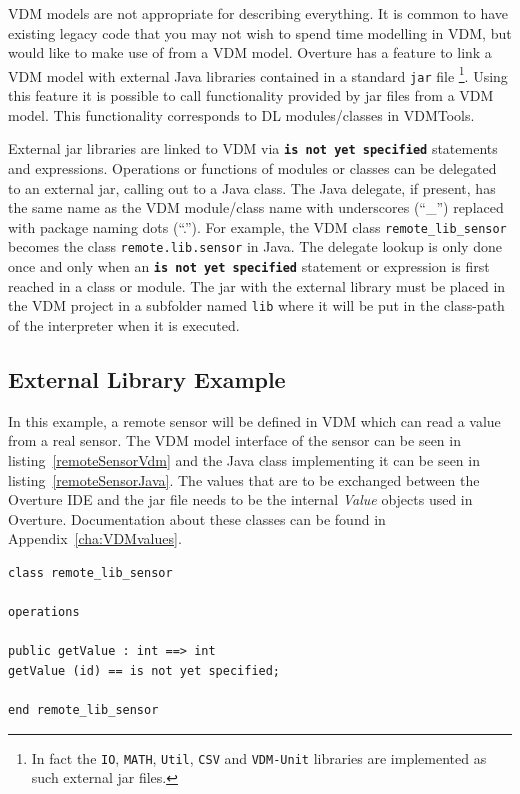 \documentclass{overturerepchap}
\begin{document}
VDM models are not appropriate for describing everything. It is common
to have existing legacy code that you may not
wish to spend time modelling in VDM, but would like to make use of
from a VDM model. Overture has a feature to link a VDM
model with external Java libraries contained in a standard \texttt{jar} file
\footnote{In fact the \texttt{IO}, \texttt{MATH}, \texttt{Util},
  \texttt{CSV} and \texttt{VDM-Unit} libraries are implemented as such
external jar files.}.
Using this feature it is possible
to call functionality provided by jar files from a VDM model. This functionality
corresponds to DL modules/classes in VDMTools\cite{DLMan}.

External jar libraries are linked to VDM via
{\textbf\texttt{is not yet specified}} statements and expressions. Operations
or functions of modules or classes can be delegated to an external
jar, calling out to a Java class. The Java delegate, if present, has
the same name as the VDM
module/class name with underscores (``\_'') replaced with package naming
dots (``.''). For example, the VDM class \texttt{remote\_lib\_sensor} becomes
the class \texttt{remote.lib.sensor} in Java. The delegate lookup is only done once and
only when an  {\textbf\texttt{is not yet specified}} statement or expression is first
reached in a class or module. The jar with the external library must be placed in
the VDM project in a subfolder named \texttt{lib} where it will be put in the
class-path of the interpreter when it is executed.

\subsection{External Library Example}
In this example, a remote sensor will be defined in VDM which can read a
value from a real sensor. The VDM model interface of the sensor can be
seen in listing~\ref{remoteSensorVdm} and the Java class
implementing it can be seen in listing~\ref{remoteSensorJava}. The
values that are to be exchanged between the Overture IDE and the jar
file needs to be the internal \emph{Value} objects used in Overture. Documentation about
these classes can be found in Appendix~\ref{cha:VDMvalues}.

\begin{lstlisting}[language=VDM++,label=remoteSensorVdm,caption=Remote sensor VDM class,captionpos=b]
class remote_lib_sensor

operations

public getValue : int ==> int
getValue (id) == is not yet specified;

end remote_lib_sensor
\end{lstlisting}
\end{document}
